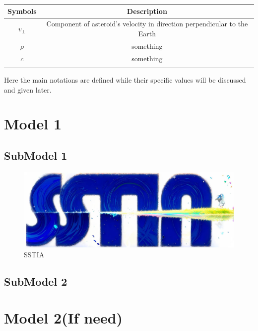 \documentclass{Setup}
\begin{document}
\begin{table}[h!] %
\begin{tabularx}{\textwidth}{cc}
\toprule
\textbf{Symbols} & \textbf{Description}\\
\toprule
  $v_{\perp}$ & Component of asteroid's velocity in direction perpendicular to the Earth \\
  $\rho$ & something \\
  $c$ & something \\
\bottomrule
\label{Notation Table}
\end{tabularx}
\end{table}

Here the main notations are defined while their specific values will be discussed and given later.


\section{Model 1}
\subsection{SubModel 1}
    \begin{figure}[h!]
        \centering
        \includegraphics[width=1.0\textwidth]{../Figures/SSTIA.jpg}
        \caption{SSTIA} \label{SSTIA}
    \end{figure}
    
    \lipsum[1-4] %
    
\subsection{SubModel 2}
\lipsum[1-4] %

\section{Model 2(If need)}
\lipsum[1-7] %
\end{document}
